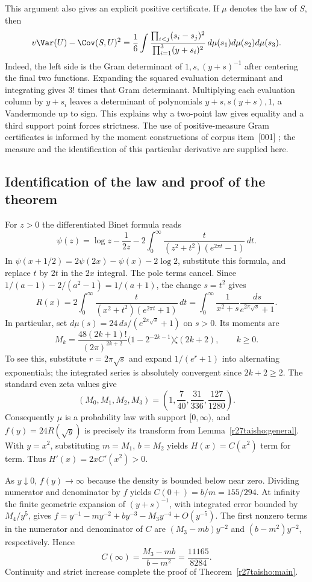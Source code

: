 \documentclass[11pt,a4paper]{article}
\numberwithin{equation}{section}
\theoremstyle{definition}
\theoremstyle{remark}
\begin{document}
This argument also gives an explicit positive certificate.
If $\mu$ denotes the law of $S$, then
\begin{equation}\label{r27taisho:triple}
 v\Var(U)-\Cov(S,U)^2=\frac1{6}
 \int\frac{\prod_{i<j}(s_i-s_j)^2}
 {\prod_{i=1}^3(y+s_i)^2}\,d\mu(s_1)d\mu(s_2)d\mu(s_3).
\end{equation}
Indeed, the left side is the Gram determinant of $1,s,(y+s)^{-1}$
after centering the final two functions. Expanding the squared evaluation
determinant and integrating gives $3!$ times that Gram determinant.
Multiplying each evaluation column by $y+s_i$ leaves a determinant of
polynomials $y+s,s(y+s),1$, a Vandermonde up to sign. This explains why a
two-point law gives equality and a third support point forces strictness.
The use of positive-measure Gram certificates is informed by the
moment constructions of corpus item~[001] \cite{r27taisho:corpus}; the measure and
the identification of this particular derivative are supplied here.

\subsection{Identification of the law and proof of the theorem}
For $z>0$ the differentiated Binet formula \cite{r27taisho:dlmf} reads
\[
 \psi(z)=\log z-\frac{1}{2z}
 -2\int_0^\infty\frac{t}{(z^2+t^2)(e^{2\pi t}-1)}\,dt.
\]
In $\psi(x+1/2)=2\psi(2x)-\psi(x)-2\log 2$, substitute this formula,
and replace $t$ by $2t$ in the $2x$ integral. The pole terms cancel.
Since $1/(a-1)-2/(a^2-1)=1/(a+1)$, the change $s=t^2$ gives
\[
 R(x)=2\int_0^\infty \frac{t}{(x^2+t^2)(e^{2\pi t}+1)}\,dt
     =\int_0^\infty \frac{1}{x^2+s}\frac{ds}{e^{2\pi\sqrt{s}}+1}.
\]
In particular, set $d\mu(s)=24\,ds/(e^{2\pi\sqrt{s}}+1)$ on $s>0$.
Its moments are
\[
 M_k=\frac{48(2k+1)!}{(2\pi)^{2k+2}}
       \big(1-2^{-2k-1}\big)\zeta(2k+2),\qquad k\ge0.
\]
To see this, substitute $r=2\pi\sqrt{s}$ and expand
$1/(e^r+1)$ into alternating exponentials; the integrated series is
absolutely convergent since $2k+2\ge2$. The standard even zeta values give
\[
 (M_0,M_1,M_2,M_3)=\left(1,\frac7{40},\frac{31}{336},\frac{127}{1280}\right).
\]
Consequently $\mu$ is a probability law with support $[0,\infty)$, and
$f(y)=24R(\sqrt{y})$ is precisely its transform from Lemma~\ref{r27taisho:general}.
With $y=x^2$, substituting $m=M_1$, $b=M_2$ yields $H(x)=C(x^2)$
term for term. Thus $H'(x)=2xC'(x^2)>0$.

As $y\downarrow0$, $f(y)\to\infty$ because the density is bounded below
near zero. Dividing numerator and denominator by $f$ yields
$C(0+)=b/m=155/294$. At infinity the finite geometric expansion of
$(y+s)^{-1}$, with integrated error bounded by $M_4/y^5$, gives
$f=y^{-1}-m y^{-2}+b y^{-3}-M_3 y^{-4}+O(y^{-5})$.
The first nonzero terms in the numerator and denominator of $C$ are
$(M_3-mb)y^{-2}$ and $(b-m^2)y^{-2}$, respectively. Hence
\[
 C(\infty)=\frac{M_3-mb}{b-m^2}=\frac{11165}{8284}.
\]
Continuity and strict increase complete the proof of Theorem~\ref{r27taisho:main}.
\end{document}
